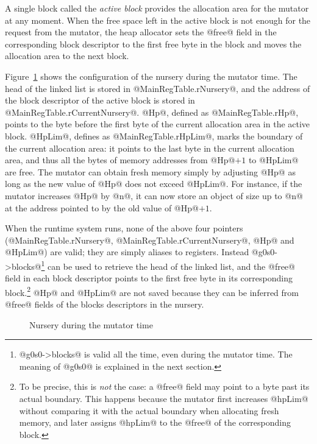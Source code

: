 \documentclass{article}
\begin{document}
A single block called the \emph{active block} provides the allocation area for
the mutator at any moment.
When the free space left in the active block is not enough for the request from 
the mutator, the heap allocator sets the @free@ field in the corresponding
block descriptor to the first free byte in the block and moves the allocation
area to the next block. 

Figure~\ref{fig-nursery} shows the configuration of the nursery during
the mutator time.
The head of the linked list is stored in @MainRegTable.rNursery@, and
the address of the block descriptor of the active block is stored 
in @MainRegTable.rCurrentNursery@.
@Hp@, defined as @MainRegTable.rHp@, points to the byte before the first byte of 
the current allocation area in the active block.
@HpLim@, defines as @MainRegTable.rHpLim@, marks the boundary of the current 
allocation area:
it points to the last byte in the current allocation area, and thus
all the bytes of memory addresses from @Hp@$ + 1$ to @HpLim@ are free.
The mutator can obtain fresh memory simply by adjusting @Hp@ as long as the new
value of @Hp@ does not exceed @HpLim@. For instance, if the mutator 
increases @Hp@ by @n@, it can now store an object of size up to @n@ at the 
address pointed to by the old value of @Hp@$ + 1$.

When the runtime system runs, none of the above four pointers 
(@MainRegTable.rNursery@, @MainRegTable.rCurrentNursery@, @Hp@ and @HpLim@) are 
valid; they are simply aliases to registers.
Instead @g0s0->blocks@\footnote{@g0s0->blocks@ is valid all the time, even during
the mutator time.  The meaning of @g0s0@ is explained in the next section.} 
can be used to retrieve the head of the linked list, and
the @free@ field in each block descriptor points to the first free byte
in its corresponding block.\footnote{To be precise, this is \emph{not} the
case: a @free@ field may point to a byte past its actual boundary.
This happens because
the mutator first increases @hpLim@ without comparing it with the
actual boundary when allocating fresh memory,
and later assigns @hpLim@ to the @free@ of the corresponding block.}
@Hp@ and @HpLim@ are not saved because they can be inferred from @free@ fields
of the blocks descriptors in the nursery.

\begin{figure}[ht]
\begin{center}

\caption{Nursery during the mutator time}
\label{fig-nursery}
\end{center}
\end{figure}
\end{document}
